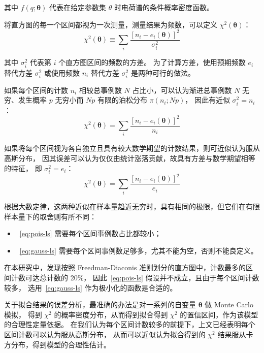 其中 $f(q;\boldsymbol{\theta})$ 代表在给定参数集 $\theta$ 时电荷谱的条件概率密度函数。

将直方图的每一个区间都视为一次测量，测量结果为频数，可以定义 $\chi^2(\boldsymbol{\theta})$：
\begin{equation}
    \chi^2(\boldsymbol{\theta})\equiv\sum_{i}\frac{\left[n_i-e_i(\boldsymbol{\theta})\right]^2}{\sigma_i^2}
\end{equation}

其中 $\sigma_i^2$ 代表第 $i$ 个直方图区间的频数的方差。
为了计算方差，使用预期频数 $e_i$ 替代方差 $\sigma_i^2$ 或使用频数 $n_i$ 替代方差 $\sigma_i^2$ 是两种可行的做法。

如果每个区间的计数 $n_i$ 相较总事例数 $N$ 占比小，可以认为渐进总事例数 $N$ 无穷、发生概率 $p$ 无穷小而 $Np$ 有限的泊松分布 $\pi(n_i;Np)$，
因此有近似 $\sigma^2_i=n_i$：
\begin{equation}
    \chi^2(\boldsymbol{\theta})=\sum_{i}\frac{\left[n_i-e_i(\boldsymbol{\theta})\right]^2}{n_i}
    \label{eq:pois-ls}
\end{equation}

如果将每个区间视为各自独立且具有较大数学期望的计数结果，则可近似认为服从高斯分布，
因其误差可以认为仅仅由统计涨落贡献，故具有方差与数学期望相等的特征，
即 $\sigma^2_i=e_i$：
\begin{equation}
    \chi^2(\boldsymbol{\theta})=\sum_{i}\frac{\left[n_i-e_i(\boldsymbol{\theta})\right]^2}{e_i}
    \label{eq:gauss-ls}
\end{equation}

根据大数定律，这两种近似在样本量趋近无穷时，具有相同的极限，但它们在有限样本量下的取舍则有所不同：
\begin{itemize}
    \item~\eqref{eq:pois-ls} 需要每个区间事例数占比都较小；
    \item~\eqref{eq:gauss-ls} 需要每个区间事例数足够多，尤其不能为空，否则不能良定义。
\end{itemize}

在本研究中，发现按照 Freedman-Diaconis 准则划分的直方图中，计数最多的区间计数可达总计数的 20\%，
因此~\eqref{eq:pois-ls} 假设并不成立，且由于每个区间计数较多，
选用~\eqref{eq:gauss-ls} 作为极小化的函数是合适的。

关于拟合结果的误差分析，最准确的办法是对一系列的自变量 $\boldsymbol{\theta}$ 做 Monte Carlo 模拟，
得到 $\chi^2$ 的概率密度分布，从而得到拟合得到 $\chi^2$ 的置信区间，作为该模型的合理性定量依据。
在我们认为每个区间计数较多的前提下，上文已经表明每个区间计数可以认为服从高斯分布，
从而可以近似认为拟合得到的 $\chi^2$ 结果服从卡方分布，得到模型的合理性估计。

